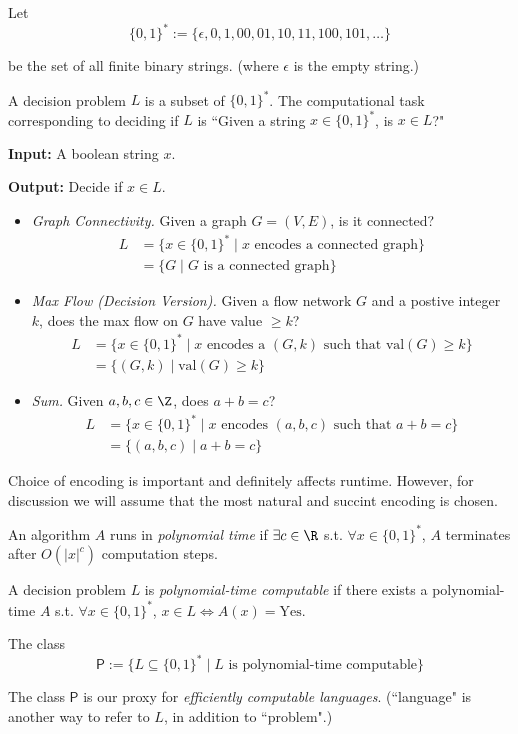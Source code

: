\def\binrep{\{0,1\}^*}

Let
$$\binrep:=\{\epsilon,0,1,00,01,10,11,100,101,\ldots\}$$

be the set of all finite binary strings. (where $\epsilon$ is the
empty string.)


A decision problem $L$ is a subset of $\binrep$. The computational
task corresponding to deciding if $L$ is ``Given a string
$x\in\binrep$, is $x\in L$?"


\textbf{Input:} A boolean string $x$.

\textbf{Output:} Decide if $x\in L$.


\begin{itemize}
	\def\B{\binrep}
	\item\textit{Graph Connectivity.} Given a graph $G=(V,E)$, is it
	      connected?
	      \begin{align*}
		      L & =\{x\in\B\mid x\text{ encodes a connected graph}\} \\
		        & =\{G \mid G \text{ is a connected graph}\}
	      \end{align*}
	\item\textit{Max Flow (Decision Version).} Given a flow network
	      $G$ and a postive integer $k$, does the max flow on $G$ have
	      value $\geq k$?
	      \begin{align*}
		      L & =\{x\in\B\mid x\text{ encodes a $(G,k)$ such that $\text{val}(G)\geq k$}\} \\
		        & =\{(G,k)\mid\text{val}(G)\geq k \}
	      \end{align*}
	\item\textit{Sum.} Given $a,b,c\in\Z$, does $a+b=c$?
	      \begin{align*}
		      L & =\{x\in\B\mid x\text{ encodes $(a,b,c)$ such that $a+b=c$}\} \\
		        & =\{(a,b,c)\mid a+b=c\}
	      \end{align*}
\end{itemize}

Choice of encoding is important and definitely affects runtime.
However, for discussion we will assume that the most natural and
succint encoding is chosen.


An algorithm $A$ runs in \textit{polynomial time} if $\exists c\in\R$
s.t. $\forall x\in\binrep$, $A$ terminates after $O(|x|^c)$
computation steps.

A decision problem $L$ is \textit{polynomial-time computable} if there
exists a polynomial-time $A$ s.t. $\forall x\in\binrep$, $x\in L\iff
	A(x)=\text{Yes}$.

The class
$$
	\mathsf P:=\{L\subseteq\binrep\mid L\text{ is polynomial-time computable}\}
$$

The class $\mathsf P$ is our proxy for \textit{efficiently computable
languages}. (``language" is another way to refer to $L$, in addition
to ``problem".)
